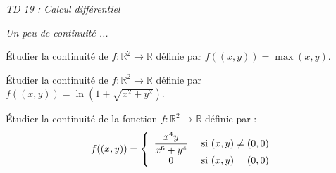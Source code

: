 \documentclass[a4paper,10pt]{report}
\begin{document}
\everymath{\displaystyle}

\begin{center}
\textit{{ {\huge TD 19 : Calcul différentiel}}}
\end{center}

\medskip

\medskip

\begin{center}
\textit{{ {\large Un peu de continuité ...}}}
\end{center}

\medskip


\begin{Exa} Étudier la continuité de $f : \mathbb{R}^2 \rightarrow \mathbb{R}$ définie par $ f((x,y))=  \max(x,y)$.
\end{Exa}


\begin{Exa} Étudier la continuité de $f : \mathbb{R}^2 \rightarrow \mathbb{R}$ définie par $f((x,y))= \ln(1 + \sqrt{x^2+y^2})$.
\end{Exa}


\begin{Exa} Étudier la continuité de la fonction $f : \mathbb{R}^2 \rightarrow \mathbb{R}$ définie par :
$$ f((x,y)) = \left\lbrace \begin{array}{cl}
\dfrac{x^4 y}{x^6+y^4} & \hbox{ si } (x,y) \neq (0,0) \\
0 & \hbox{ si } (x,y)=(0,0) \\
\end{array}\right.$$
\end{Exa}

%
%
\end{document}
